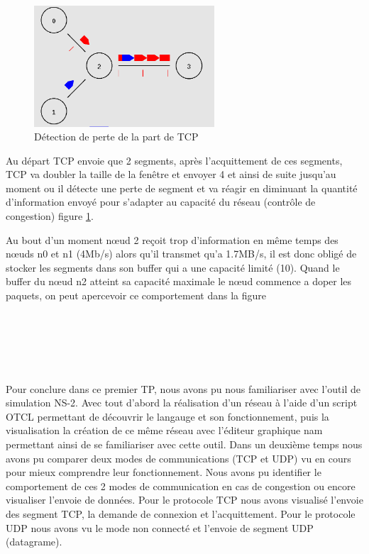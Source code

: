 \documentclass[11pt]{article}
\begin{document}
\begin{enumerate}
\begin{figure}[H]
	\begin{center}
		\includegraphics[width=0.6\textwidth]{assets/tp1/tcpDetectionPerte.png}
	\end{center}
	\caption{Détection de perte de la part de TCP}
	\label{detectPaquete}
\end{figure}
	
	
	
\end{enumerate}


Au départ TCP envoie que 2 segments, après l’acquittement de ces segments, TCP va doubler la taille de la fenêtre et envoyer 4 et ainsi de suite jusqu'au moment ou il détecte une perte de segment et va réagir en diminuant la quantité d'information envoyé pour s'adapter au capacité du réseau (contrôle de congestion) figure \ref{detectPaquete}. 

Au bout d'un moment nœud 2 reçoit trop d'information en même temps des nœuds n0 et n1 (4Mb/s) alors qu'il transmet qu'a 1.7MB/s, il est donc obligé de stocker les segments dans son buffer qui a une capacité limité (10). Quand le buffer du nœud n2 atteint sa capacité maximale le nœud commence a doper les paquets, on peut apercevoir ce comportement dans la figure 

~\\
\\
\\
\\
\\


Pour conclure dans ce premier TP, nous avons pu nous familiariser avec l’outil de simulation NS-2. Avec tout d’abord la réalisation d'un réseau à l’aide d’un script OTCL permettant de découvrir le langauge et son fonctionnement, puis la visualisation la création de ce même réseau avec l'éditeur graphique nam permettant ainsi de se familiariser avec cette outil. Dans un deuxième temps nous avons pu comparer deux modes de communications (TCP et UDP) vu en cours pour mieux comprendre leur fonctionnement. Nous avons pu identifier le comportement de ces 2 modes de communication en cas de congestion ou encore visualiser l'envoie de données. Pour le protocole TCP nous avons visualisé l'envoie des segment TCP, la demande de connexion et l'acquittement. Pour le protocole UDP nous avons vu le mode non connecté et l'envoie de segment UDP (datagrame).
\end{document}
